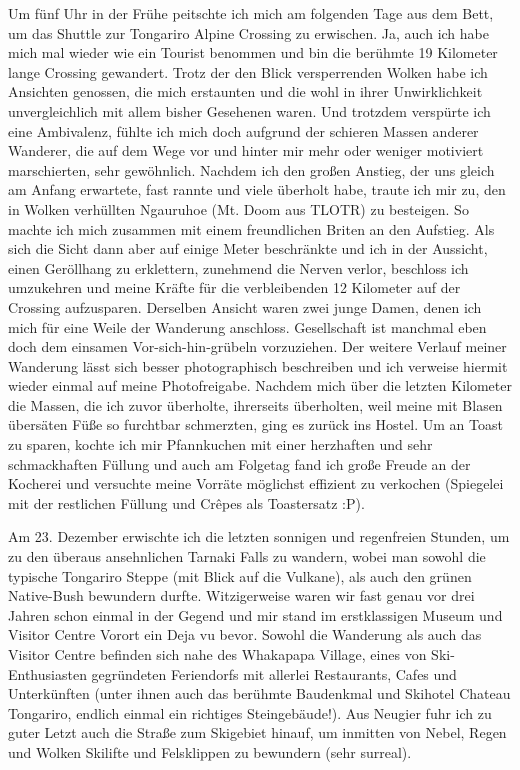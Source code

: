 Um fünf Uhr in der Frühe peitschte ich mich am folgenden Tage aus dem
Bett, um das Shuttle zur Tongariro Alpine Crossing zu erwischen. Ja,
auch ich habe mich mal wieder wie ein Tourist benommen und bin die
berühmte 19 Kilometer lange Crossing gewandert. Trotz der den Blick
versperrenden Wolken habe ich Ansichten genossen, die mich erstaunten
und die wohl in ihrer Unwirklichkeit unvergleichlich mit allem bisher
Gesehenen waren. Und trotzdem verspürte ich eine Ambivalenz, fühlte ich
mich doch aufgrund der schieren Massen anderer Wanderer, die auf dem
Wege vor und hinter mir mehr oder weniger motiviert marschierten, sehr
gewöhnlich. Nachdem ich den großen Anstieg, der uns gleich am Anfang
erwartete, fast rannte und viele überholt habe, traute ich mir zu, den
in Wolken verhüllten Ngauruhoe (Mt. Doom aus TLOTR) zu besteigen. So
machte ich mich zusammen mit einem freundlichen Briten an den Aufstieg.
Als sich die Sicht dann aber auf einige Meter beschränkte und ich in der
Aussicht, einen Geröllhang zu erklettern, zunehmend die Nerven verlor,
beschloss ich umzukehren und meine Kräfte für die verbleibenden 12
Kilometer auf der Crossing aufzusparen. Derselben Ansicht waren zwei
junge Damen, denen ich mich für eine Weile der Wanderung anschloss.
Gesellschaft ist manchmal eben doch dem einsamen Vor-sich-hin-grübeln
vorzuziehen. Der weitere Verlauf meiner Wanderung lässt sich besser
photographisch beschreiben und ich verweise hiermit wieder einmal auf
meine Photofreigabe. Nachdem mich über die letzten Kilometer die Massen,
die ich zuvor überholte, ihrerseits überholten, weil meine mit Blasen
übersäten Füße so furchtbar schmerzten, ging es zurück ins Hostel. Um an
Toast zu sparen, kochte ich mir Pfannkuchen mit einer herzhaften und
sehr schmackhaften Füllung und auch am Folgetag fand ich große Freude an
der Kocherei und versuchte meine Vorräte möglichst effizient zu
verkochen (Spiegelei mit der restlichen Füllung und Crêpes als
Toastersatz :P).

Am 23. Dezember erwischte ich die letzten sonnigen und regenfreien
Stunden, um zu den überaus ansehnlichen Tarnaki Falls zu wandern, wobei
man sowohl die typische Tongariro Steppe (mit Blick auf die Vulkane),
als auch den grünen Native-Bush bewundern durfte. Witzigerweise waren
wir fast genau vor drei Jahren schon einmal in der Gegend und mir stand
im erstklassigen Museum und Visitor Centre Vorort ein Deja vu bevor.
Sowohl die Wanderung als auch das Visitor Centre befinden sich nahe des
Whakapapa Village, eines von Ski-Enthusiasten gegründeten Feriendorfs
mit allerlei Restaurants, Cafes und Unterkünften (unter ihnen auch das
berühmte Baudenkmal und Skihotel Chateau Tongariro, endlich einmal ein
richtiges Steingebäude!). Aus Neugier fuhr ich zu guter Letzt auch die
Straße zum Skigebiet hinauf, um inmitten von Nebel, Regen und Wolken
Skilifte und Felsklippen zu bewundern (sehr surreal).

